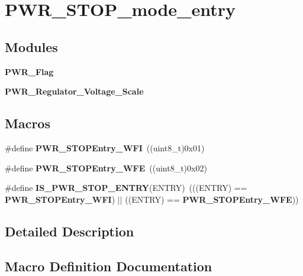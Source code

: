 \section{P\+W\+R\+\_\+\+S\+T\+O\+P\+\_\+mode\+\_\+entry}
\label{group__PWR__STOP__mode__entry}
\subsection*{Modules}
\begin{DoxyCompactItemize}
\item 
\textbf{ P\+W\+R\+\_\+\+Flag}
\item 
\textbf{ P\+W\+R\+\_\+\+Regulator\+\_\+\+Voltage\+\_\+\+Scale}
\end{DoxyCompactItemize}
\subsection*{Macros}
\begin{DoxyCompactItemize}
\item 
\#define \textbf{ P\+W\+R\+\_\+\+S\+T\+O\+P\+Entry\+\_\+\+W\+FI}~((uint8\+\_\+t)0x01)
\item 
\#define \textbf{ P\+W\+R\+\_\+\+S\+T\+O\+P\+Entry\+\_\+\+W\+FE}~((uint8\+\_\+t)0x02)
\item 
\#define \textbf{ I\+S\+\_\+\+P\+W\+R\+\_\+\+S\+T\+O\+P\+\_\+\+E\+N\+T\+RY}(E\+N\+T\+RY)~(((E\+N\+T\+RY) == \textbf{ P\+W\+R\+\_\+\+S\+T\+O\+P\+Entry\+\_\+\+W\+FI}) $\vert$$\vert$ ((E\+N\+T\+RY) == \textbf{ P\+W\+R\+\_\+\+S\+T\+O\+P\+Entry\+\_\+\+W\+FE}))
\end{DoxyCompactItemize}


\subsection{Detailed Description}


\subsection{Macro Definition Documentation}
\mbox{\label{group__PWR__STOP__mode__entry_ga4a94eb1f400dec6e486fbc229cbea8a0}} 
